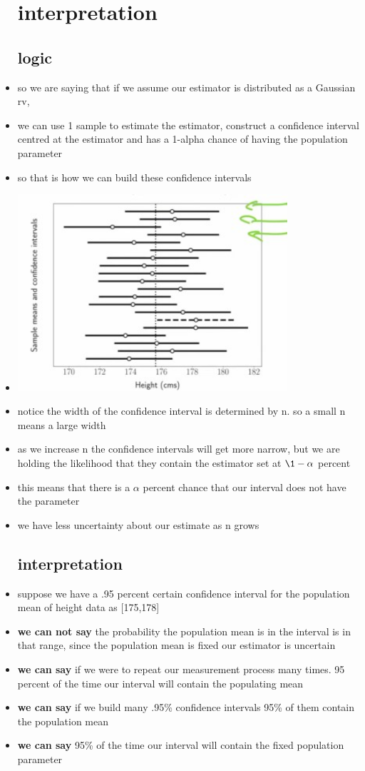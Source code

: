 \documentclass{article}
\begin{document}
\begin{itemize}
\section{interpretation}
\subsection{logic}
\item so we are saying that if we assume our estimator is distributed as a Gaussian rv, 
\item we can use 1 sample to estimate the estimator, construct a confidence interval centred at the estimator and has a 1-alpha chance of having the population parameter 
\item so that is how we can build these confidence intervals
\item \includegraphics[width=10cm]{notes/week_4/vidio 4: Confidince Intervals/immages/v4_3.jpg}
\item notice the width of the confidence interval is determined by n. so a small n means a large width 
\item as we increase n the confidence intervals will get more narrow, but we are holding the likelihood that they contain the estimator set at $\1-\alpha$ percent
\item this means that there is a $\alpha$ percent chance that our interval does not have the parameter
\item we have less uncertainty about our estimate as n grows
\subsection{interpretation}
\item suppose we have a .95 percent certain confidence interval for the population mean of height data as [175,178]
\item \textbf{we can not say} the probability the population mean is in the interval is in that range, since the population mean is fixed our estimator is uncertain 
\item \textbf{we can say} if we were to repeat our measurement process many times. 95 percent of the time our interval will contain the populating mean 
\item  \textbf{we can say} if we build many .95\% confidence intervals 95\% of them contain the population mean 
\item  \textbf{we can say} 95\% of the time our interval will contain the fixed population parameter

\end{itemize}
\end{document}
